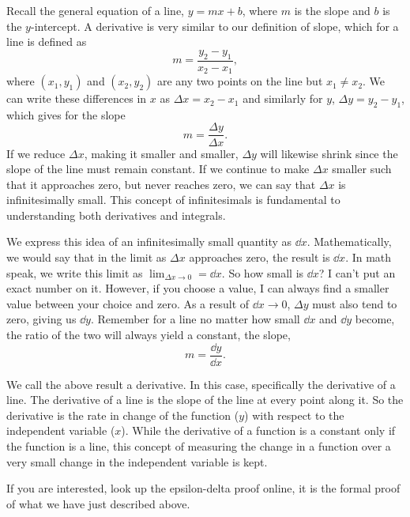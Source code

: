 \documentclass[final,a4paper,12pt]{article}
\theoremstyle{definition}
\begin{document}
Recall the general equation of a line, $y = m x + b$, where $m$ is the slope and
$b$ is the $y$-intercept.  A derivative is very similar to our definition of
slope, which for a line is defined as 
\begin{equation}
    m = \frac{y_2 - y_1}{x_2 - x_1} ,
\end{equation}
where $(x_1,y_1)$ and $(x_2,y_2)$ are any two points on the line but $x_1 \neq
x_2$.  We can write these differences in $x$ as $\Delta x = x_2 - x_1$ and
similarly for $y$, $\Delta y = y_2 - y_1$, which gives for the slope
\begin{equation}
    m = \frac{\Delta y}{\Delta x} .
\end{equation}
If we reduce $\Delta x$, making it smaller and smaller, $\Delta y$ will likewise
shrink since the slope of the line must remain constant.  If we continue to make
$\Delta x$ smaller such that it approaches zero, but never reaches zero, we can
say that $\Delta x$ is infinitesimally small.  This concept of infinitesimals is
fundamental to understanding both derivatives and integrals.

We express this idea of an infinitesimally small quantity as $\dd{x}$.
Mathematically, we would say that in the limit as $\Delta x$ approaches zero,
the result is $\dd{x}$. In math speak, we write this limit as $\lim_{\Delta x \to
0} = \dd{x}$.  So how small is $\dd{x}$?  I can't put an exact number on it.
However, if you choose a value, I can always find a smaller value between your
choice and zero.  As a result of $\dd{x} \to 0$, $\Delta y$ must also tend to
zero, giving us $\dd{y}$.  Remember for a line no matter how small $\dd{x}$ and
$\dd{y}$ become, the ratio of the two will always yield a constant, the slope,
\begin{equation}
    m = \frac{\dd{y}}{\dd{x}} .
\end{equation}

We call the above result a derivative.  In this case, specifically the
derivative of a line.  The derivative of a line is the slope of the line at
every point along it.  So the derivative is the rate in change of the function
($y$) with respect to the independent variable ($x$).  While the derivative of
a function is a constant only if the function is a line, this
concept of measuring the change in a function over a very small change in the
independent variable is kept.

If you are interested, look up the epsilon-delta proof online, it is the formal
proof of what we have just described above.
\end{document}
